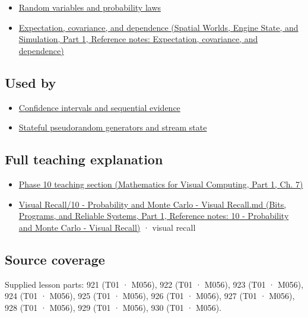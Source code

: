 \hypertarget{appendix-a2360b435383-prerequisites}{}

\begin{itemize}
\tightlist
\item
  \hyperref[appendix-4d0203f7944f]{Random variables and probability laws}
\item
  \href{../05-Spatial-Worlds-Engine-State-and-Simulation-P01/main.pdf\#appendix-54c383df9992}{Expectation, covariance, and dependence (Spatial Worlds, Engine State, and Simulation, Part 1, Reference notes: Expectation, covariance, and dependence)}
\end{itemize}

\subsection{Used by}\label{appendix-a2360b435383-used-by}

\hypertarget{appendix-a2360b435383-used-by}{}

\begin{itemize}
\tightlist
\item
  \hyperref[appendix-c83016554b1e]{Confidence intervals and sequential evidence}
\item
  \hyperref[appendix-e0f7c7e08f3a]{Stateful pseudorandom generators and stream state}
\end{itemize}

\subsection{Full teaching explanation}\label{appendix-a2360b435383-full-teaching-explanation}

\hypertarget{appendix-a2360b435383-full-teaching-explanation}{}

\begin{itemize}
\tightlist
\item
  \href{../02-Mathematics-for-Visual-Computing-P01/main.pdf\#02-foundations-ii-ch023-discrete-and-continuous-distribution-families}{Phase 10 teaching section (Mathematics for Visual Computing, Part 1, Ch. 7)}
\item
  \href{../01-Bits-Programs-and-Reliable-Systems-P01/main.pdf\#appendix-cb5af353ef77}{Visual Recall/10 - Probability and Monte Carlo - Visual Recall.md (Bits, Programs, and Reliable Systems, Part 1, Reference notes: 10 - Probability and Monte Carlo - Visual Recall)} · visual recall
\end{itemize}

\subsection{Source coverage}\label{appendix-a2360b435383-source-coverage}

\hypertarget{appendix-a2360b435383-source-coverage}{}

Supplied lesson parts: 921 (T01 · M056), 922 (T01 · M056), 923 (T01 · M056), 924 (T01 · M056), 925 (T01 · M056), 926 (T01 · M056), 927 (T01 · M056), 928 (T01 · M056), 929 (T01 · M056), 930 (T01 · M056).
